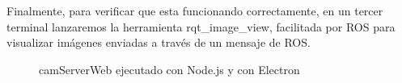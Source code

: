 Finalmente, para verificar que esta funcionando correctamente, en un tercer terminal lanzaremos la herramienta rqt\_image\_view, facilitada por ROS para visualizar imágenes enviadas a través de un mensaje de ROS.
\begin{figure}[H]
  \begin{center}
    \caption{camServerWeb ejecutado con Node.js y con Electron}
     \label{fig.ejecuccioncamserver}
     \end{center}
\end{figure}
